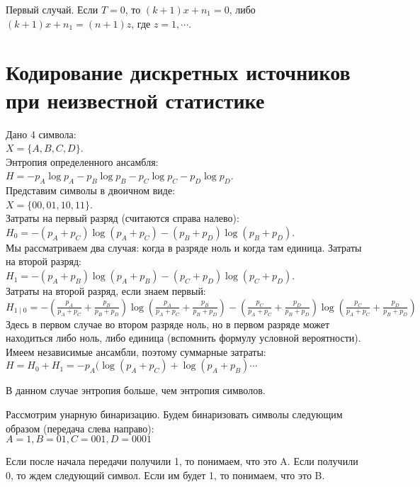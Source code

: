{\begin{itemize}
\end{itemize}

Первый случай. Если $T = 0$, то $(k + 1) x + n_1 = 0$, либо $(k+1)x + n_1 = (n
+ 1)z$, где $z = 1, \cdots$.

\section{Кодирование дискретных источников при неизвестной статистике}

Дано 4 символа:\\
$X = \{A, B, C, D\}$.\\
Энтропия определенного ансамбля:\\
$H = -p_A \log p_A - p_B \log p_B - p_C \log p_C - p_D \log p_D$.\\

Представим символы в двоичном виде:\\
$X = \{00, 01, 10, 11\}$.\\
Затраты на первый разряд (считаются справа налево):\\
$H_0 = -(p_A + p_C) \log(p_A + p_C) - (p_B + p_D) \log(p_B + p_D)$.\\
Мы рассматриваем два случая: когда в разряде ноль и когда там единица.
Затраты на второй разряд:\\
$H_1 = -(p_A + p_B) \log(p_A + p_B) - (p_C + p_D) \log(p_C + p_D)$.\\
Затраты на второй разряд, если знаем первый:\\
$H_{1 \mid 0} = 
-(\frac{p_A}{p_A + p_C} + \frac{p_B}{p_B + p_D})
\log (\frac{p_A}{p_A + p_C} + \frac{p_B}{p_B + p_D}) -
(\frac{p_C}{p_A + p_C} + \frac{p_D}{p_B + p_D})
\log (\frac{p_C}{p_A + p_C} + \frac{p_D}{p_B + p_D})$\\
Здесь в первом случае во втором разряде ноль, но в первом разряде может
находиться либо ноль, либо единица (вспомнить формулу условной вероятности).\\

Имеем независимые ансамбли, поэтому суммарные затраты:\\
$H = H_0 + H_1 = -p_A (\log(p_A + p_C) + \log(p_A + p_B) \cdots$

В данном случае энтропия больше, чем энтропия символов.

Рассмотрим унарную бинаризацию.
Будем бинаризовать символы следующим образом (передача слева направо):\\
$A = 1, B = 01, C = 001, D = 0001$

Если после начала передачи получили 1, то понимаем, что это A. Если получили 0,
то ждем следующий символ. Если им будет 1, то понимаем, что это B.

}
